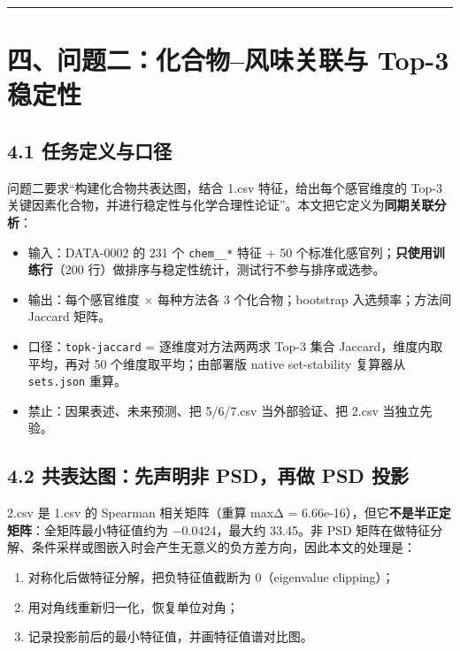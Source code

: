 \documentclass[
  11pt,
]{ctexart}
\providecommand{\tightlist}{%
  \setlength{\itemsep}{0pt}\setlength{\parskip}{0pt}}
\begin{document}
\begin{center}\rule{0.5\linewidth}{0.5pt}\end{center}

\section{四、问题二：化合物--风味关联与 Top-3
稳定性}\label{ux56dbux95eeux9898ux4e8cux5316ux5408ux7269ux98ceux5473ux5173ux8054ux4e0e-top-3-ux7a33ux5b9aux6027}

\subsection{4.1
任务定义与口径}\label{ux4efbux52a1ux5b9aux4e49ux4e0eux53e3ux5f84}

问题二要求``构建化合物共表达图，结合 1.csv 特征，给出每个感官维度的
Top-3
关键因素化合物，并进行稳定性与化学合理性论证''。本文把它定义为\textbf{同期关联分析}：

\begin{itemize}
\tightlist
\item
  输入：DATA-0002 的 231 个 \texttt{chem\_\_*} 特征 + 50
  个标准化感官列；\textbf{只使用训练行}（200
  行）做排序与稳定性统计，测试行不参与排序或选参。
\item
  输出：每个感官维度 × 每种方法各 3 个化合物；bootstrap 入选频率；方法间
  Jaccard 矩阵。
\item
  口径：\texttt{topk-jaccard} = 逐维度对方法两两求 Top-3 集合
  Jaccard，维度内取平均，再对 50 个维度取平均；由部署版 native
  set-stability 复算器从 \texttt{sets.json} 重算。
\item
  禁止：因果表述、未来预测、把 5/6/7.csv 当外部验证、把 2.csv
  当独立先验。
\end{itemize}

\subsection{4.2 共表达图：先声明非 PSD，再做 PSD
投影}\label{ux5171ux8868ux8fbeux56feux5148ux58f0ux660eux975e-psdux518dux505a-psd-ux6295ux5f71}

2.csv 是 1.csv 的 Spearman 相关矩阵（重算 max\textbar Δ\textbar{} =
6.66e-16），但它\textbf{不是半正定矩阵}：全矩阵最小特征值约为
−0.0424，最大约 33.45。非 PSD
矩阵在做特征分解、条件采样或图嵌入时会产生无意义的负方差方向，因此本文的处理是：

\begin{enumerate}
\def\labelenumi{\arabic{enumi}.}
\tightlist
\item
  对称化后做特征分解，把负特征值截断为 0（eigenvalue clipping）；
\item
  用对角线重新归一化，恢复单位对角；
\item
  记录投影前后的最小特征值，并画特征值谱对比图。
\end{enumerate}
\end{document}

